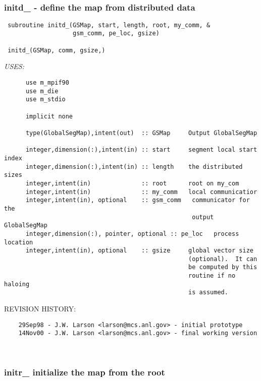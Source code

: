  
\mbox{}\hrulefill\ 
 

 \subsubsection{initd\_ - define the map from distributed data}


 
 
\begin{verbatim} 
 subroutine initd_(GSMap, start, length, root, my_comm, &
                   gsm_comm, pe_loc, gsize)
 
 initd_(GSMap, comm, gsize,)\end{verbatim}{\em USES:}
\begin{verbatim}      use m_mpif90
      use m_die
      use m_stdio
 
      implicit none
 
      type(GlobalSegMap),intent(out)  :: GSMap     Output GlobalSegMap
 
      integer,dimension(:),intent(in) :: start     segment local start index 
      integer,dimension(:),intent(in) :: length    the distributed sizes
      integer,intent(in)              :: root      root on my_com
      integer,intent(in)              :: my_comm   local communicatior
      integer,intent(in), optional    :: gsm_comm   communicator for the
                                                    output GlobalSegMap
      integer,dimension(:), pointer, optional :: pe_loc   process location
      integer,intent(in), optional    :: gsize     global vector size
                                                   (optional).  It can
                                                   be computed by this 
                                                   routine if no haloing
                                                   is assumed.
 \end{verbatim}{\sf REVISION HISTORY:}
\begin{verbatim}  	29Sep98 - J.W. Larson <larson@mcs.anl.gov> - initial prototype
  	14Nov00 - J.W. Larson <larson@mcs.anl.gov> - final working version\end{verbatim}
 
 
\mbox{}\hrulefill\ 
 

 \subsubsection{initr\_ initialize the map from the root}


